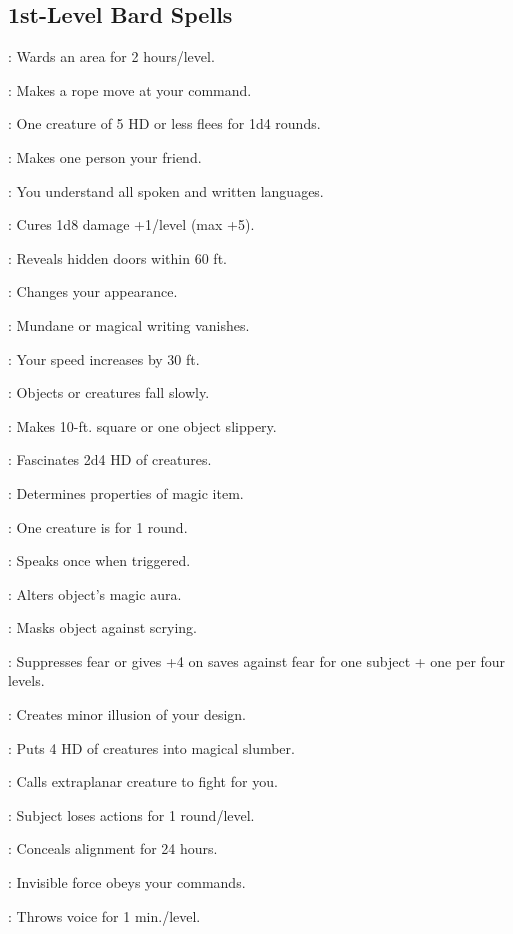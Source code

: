 \begin{multicols}{2}
\subsection{1st-Level Bard Spells}
\begin{description*}
\item[\linkspell{Alarm}:] Wards an area for 2 hours/level.
\item[\linkspell{Animate Rope}:] Makes a rope move at your command.
\item[\linkspell{Cause Fear}:] One creature of 5 HD or less flees for 1d4 rounds.
\item[\linkspell{Charm Person}:] Makes one person your friend.
\item[\linkspell{Comprehend Languages}:] You understand all spoken and written languages.
\item[\linkspell{Cure Light Wounds}:] Cures 1d8 damage +1/level (max +5).
\item[\linkspell{Detect Secret Doors}:] Reveals hidden doors within 60 ft.
\item[\linkspell{Disguise Self}:] Changes your appearance.
\item[\linkspell{Erase}:] Mundane or magical writing vanishes.
\item[\linkspell{Expeditious Retreat}:] Your speed increases by 30 ft.
\item[\linkspell{Feather Fall}:] Objects or creatures fall slowly.
\item[\linkspell{Grease}:] Makes 10-ft. square or one object slippery.
\item[\linkspell{Hypnotism}:] Fascinates 2d4 HD of creatures.
\item[\linkspell{Identify}:] Determines properties of magic item.
\item[\linkspell{Lesser Confusion}:] One creature is  for 1 round.
\item[\linkspell{Magic Mouth}:] Speaks once when triggered.
\item[\linkspell{Nystul’s Magic Aura}:] Alters object’s magic aura.
\item[\linkspell{Obscure Object}:] Masks object against scrying.
\item[\linkspell{Remove Fear}:] Suppresses fear or gives +4 on saves against fear for one subject + one per four levels.
\item[\linkspell{Silent Image}:] Creates minor illusion of your design.
\item[\linkspell{Sleep}:] Puts 4 HD of creatures into magical slumber.
\item[\linkspell{Summon Monster I}:] Calls extraplanar creature to fight for you.
\item[\linkspell{Tasha’s Hideous Laughter}:] Subject loses actions for 1 round/level.
\item[\linkspell{Undetectable Alignment}:] Conceals alignment for 24 hours.
\item[\linkspell{Unseen Servant}:] Invisible force obeys your commands.
\item[\linkspell{Ventriloquism}:] Throws voice for 1 min./level.
\end{description*}


\end{multicols}
